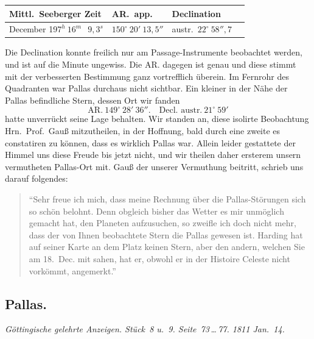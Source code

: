 \documentclass[12pt,a4paper]{book}
\begin{document}
\begin{small}
\begin{center}
\begin{tabular}{llll}
\toprule
Mittl.~Seeberger Zeit & AR.~app. & Declination \\
\midrule
December 19\quad $7^{h}\ 16^{m}\ \phantom{0}9{,}3^{s}$ & $150^{\circ}\ 20'\ 13{,}5''$ & austr.\ $22^{\circ}\ 58''{,}7$ \\
\bottomrule
\end{tabular}
\end{center}
\end{small}

Die Declination konnte freilich nur am Passage-Instrumente beobachtet werden, und ist auf die Minute ungewiss. Die AR. dagegen ist genau und diese stimmt mit der verbesserten Bestimmung ganz vortrefflich \"uberein. Im Fernrohr des Quadranten war Pallas durchaus nicht sichtbar. Ein kleiner in der N\"ahe der Pallas befindliche Stern, dessen Ort wir fanden
\[\text{AR.}\ 149^{\circ}\ 28'\ 36''.\quad \text{Decl.\ austr.}\ 21^{\circ}\ 59'\]
hatte unverr\"uckt seine Lage behalten. Wir standen an, diese isolirte Beobachtung Hrn.~Prof.~Gau{\ss} mitzutheilen, in der Hoffnung, bald durch eine zweite es constatiren zu k\"onnen, dass es wirklich Pallas war. Allein leider gestattete der Himmel uns diese Freude bis jetzt nicht, und wir theilen daher ersterem unsern vermutheten Pallas-Ort mit. Gau{\ss} der unserer Vermuthung beitritt, schrieb uns darauf folgendes:

\begin{quote}
``Sehr freue ich mich, dass meine Rechnung \"uber die Pallas-St\"orungen sich so sch\"on belohnt. Denn obgleich bisher das Wetter es mir unm\"oglich gemacht hat, den Planeten aufzusuchen, so zweifle ich doch nicht mehr, dass der von Ihnen beobachtete Stern die Pallas gewesen ist. Harding hat auf seiner Karte an dem Platz keinen Stern, aber den andern, welchen Sie am 18.~Dec. mit sahen, hat er, obwohl er in der Histoire Celeste nicht vork\"ommt, angemerkt.''
\end{quote}


\newpage
\subsection*{Pallas.}

\textit{G\"ottingische gelehrte Anzeigen. St\"uck~8 u.~9. Seite~73\,\ldots\,77. 1811 Jan.~14.}
\end{document}
